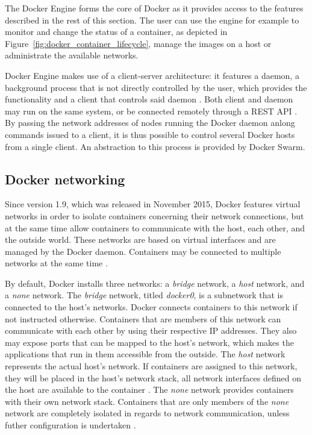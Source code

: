    The Docker Engine forms the core of Docker as it provides access to the features described in the rest of this section.
   The user can use the engine for example to monitor and change the status of a container, \eg as depicted in Figure~\ref{fig:docker_container_lifecycle}, manage the images on a host or administrate the available networks.

   Docker Engine makes use of a client-server architecture: it features a daemon, \ie a background process that is not directly controlled by the user, which provides the functionality and a client that controls said daemon \cite{Docker????DockerCom}. Both client and daemon may run on the same system, or be connected remotely through a \ac{REST} \ac{API} \cite{Docker2016Docker}. By passing the network addresses of nodes running the Docker daemon anlong commands issued to a client, it is thus possible to control several Docker hosts from a single client. An abstraction to this process is provided by Docker Swarm.


  \subsection{Docker networking} %
  \label{sub:docker_networks}
    Since version 1.9, which was released in November 2015, Docker features virtual networks in order to isolate containers concerning their network connections, but at the same time allow containers to communicate with the host, each other, and the outside world. These networks are based on virtual interfaces and are managed by the Docker daemon. Containers may be connected to multiple networks at the same time \cite{Docker2016Docker}.

    By default, Docker installs three networks: a \emph{bridge} network, a \emph{host} network, and a \emph{none} network.
    The \emph{bridge} network, titled \emph{docker0}, is a subnetwork that is connected to the host's networks. Docker connects containers to this network if not instructed otherwise. Containers that are members of this network can communicate with each other by using their respective \ac{IP} addresses. They also may expose ports that can be mapped to the host's network, which makes the applications that run in them accessible from the outside.
    The \emph{host} network represents the actual host's network. If containers are assigned to this network, they will be placed in the host's network stack, \ie all network interfaces defined on the host are available to the container \cite{Docker2016Docker}.
    The \emph{none} network provides containers with their own network stack. Containers that are only members of the \emph{none} network are completely isolated in regards to network communication, unless futher configuration is undertaken \cite{Docker2016Docker}.

